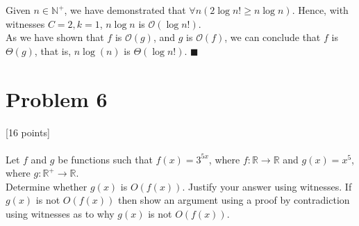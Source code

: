 \documentclass[answers]{exam}
\newcommand{\pt}[1]{\vspace{-0.8em}\textcolor{myDColor}{[#1 points]} \\\\}
\newcommand{\bigo}[1]{\mathcal{O}(#1)}
\renewcommand{\qed}{
   $\blacksquare$\\
}
\newenvironment{colored}[1][]{
    \bgroup\color{#1}
}{
\egroup\vspace{-0.8em}
}
\newenvironment{problem}[1][Problem]{\section*{\textcolor{myLColor}{#1}}}{\vspace{0.2em}}
\renewenvironment{solution}[1][]{\begin{answer}[#1]\begin{colored}[mySolColor]}{\end{colored}\end{answer}\vspace{1em}}
\begin{document}
\begin{solution}[by witnesses]
    \noindent Given $n \in \mathbb{N}^{+}$, we have demonstrated that $\forall n (2 \log n! \ge n\log n)$. Hence, with witnesses $C = 2, k = 1$, $n \log n$ is $\bigo{\log n!}$.\\

    \noindent As we have shown that $f$ is $\bigo{g}$, and $g$ is $\bigo{f}$, we can conclude that $f$ is $\Theta(g)$, that is, $n\log(n)$ is $\Theta(\log n!)$.\qed
\end{solution}

\pagebreak

\begin{problem}[Problem 6]
    \pt{16} Let $f$ and $g$ be functions such that $f(x) = 3^{5x}$, where $f: \mathbb{R} \rightarrow \mathbb{R}$ and $g(x) = x^5$, where $g: \mathbb{R^+} \rightarrow \mathbb{R}$.\\
    
    \noindent Determine whether $g(x)$ is $O(f(x))$. Justify your answer using witnesses. If $g(x)$ is not $O(f(x))$ then show an argument using a proof by contradiction using witnesses as to why $g(x)$ is not $O(f(x))$.
\end{problem}
\end{document}
